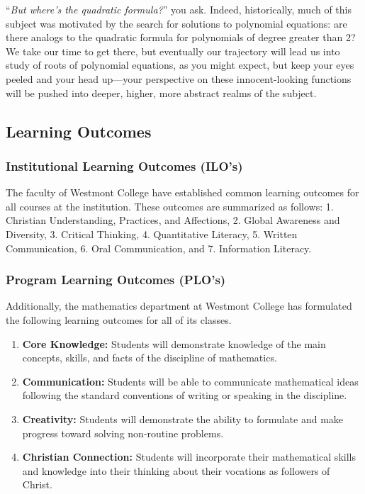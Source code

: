 \documentclass[
  twoside]{article}
\providecommand{\tightlist}{%
  \setlength{\itemsep}{0pt}\setlength{\parskip}{0pt}}
\begin{document}
``\emph{But where's the quadratic formula?}'' you ask. Indeed,
historically, much of this subject was motivated by the search for
solutions to polynomial equations: are there analogs to the quadratic
formula for polynomials of degree greater than 2? We take our time to
get there, but eventually our trajectory will lead us into study of
roots of polynomial equations, as you might expect, but keep your eyes
peeled and your head up---your perspective on these innocent-looking
functions will be pushed into deeper, higher, more abstract realms of
the subject.

\subsection{Learning Outcomes}\label{learning-outcomes}

\subsubsection{Institutional Learning Outcomes
(ILO's)}\label{institutional-learning-outcomes-ilos}

The faculty of Westmont College have established common learning
outcomes for all courses at the institution. These outcomes are
summarized as follows: 1. Christian Understanding, Practices, and
Affections, 2. Global Awareness and Diversity, 3. Critical Thinking, 4.
Quantitative Literacy, 5. Written Communication, 6. Oral Communication,
and 7. Information Literacy.

\subsubsection{Program Learning Outcomes
(PLO's)}\label{program-learning-outcomes-plos}

Additionally, the mathematics department at Westmont College has
formulated the following learning outcomes for all of its classes.

\begin{enumerate}
\def\labelenumi{\arabic{enumi}.}
\tightlist
\item
  \textbf{Core Knowledge:} Students will demonstrate knowledge of the
  main concepts, skills, and facts of the discipline of mathematics.
\item
  \textbf{Communication:} Students will be able to communicate
  mathematical ideas following the standard conventions of writing or
  speaking in the discipline.
\item
  \textbf{Creativity:} Students will demonstrate the ability to
  formulate and make progress toward solving non-routine problems.
\item
  \textbf{Christian Connection:} Students will incorporate their
  mathematical skills and knowledge into their thinking about their
  vocations as followers of Christ.
\end{enumerate}
\end{document}
